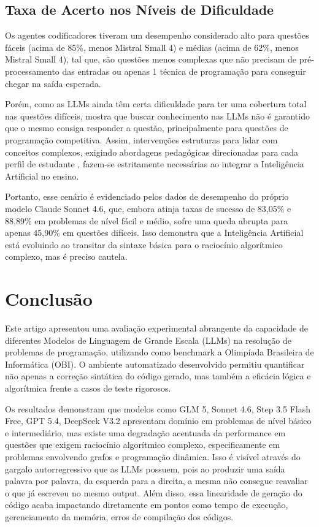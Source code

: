 \documentclass[12pt]{article}
\begin{document}
\subsection{Taxa de Acerto nos Níveis de Dificuldade}

Os agentes codificadores tiveram um desempenho considerado alto para questões fáceis (acima de 85\%, menos Mistral Small 4) e médias (acima de 62\%, menos Mistral Small 4), tal que, são questões menos complexas que não precisam de pré-processamento das entradas ou apenas 1 técnica de programação para conseguir chegar na saída esperada.

Porém, como as LLMs ainda têm certa dificuldade para ter uma cobertura total nas questões difíceis, mostra que buscar conhecimento nas LLMs não é garantido que o mesmo consiga responder a questão, principalmente para questões de programação competitiva. Assim, intervenções estruturas para lidar com conceitos complexos, exigindo abordagens pedagógicas direcionadas para cada perfil de estudante \cite{baist2017analysis}, fazem-se estritamente necessárias ao integrar a Inteligência Artificial no ensino.

Portanto, esse cenário é evidenciado pelos dados de desempenho do próprio modelo Claude Sonnet 4.6, que, embora atinja taxas de sucesso de 83,05\% e 88,89\% em problemas de nível fácil e médio, sofre uma queda abrupta para apenas 45,90\% em questões difíceis. Isso demonstra que a Inteligência Artificial está evoluindo ao transitar da sintaxe básica para o raciocínio algorítmico complexo, mas é preciso cautela.

\section{Conclusão}

Este artigo apresentou uma avaliação experimental abrangente da capacidade de diferentes Modelos de Linguagem de Grande Escala (LLMs) na resolução de problemas de programação, utilizando como benchmark a Olimpíada Brasileira de Informática (OBI). O ambiente automatizado desenvolvido permitiu quantificar não apenas a correção sintática do código gerado, mas também a eficácia lógica e algorítmica frente a casos de teste rigorosos.

Os resultados demonstram que modelos como GLM 5, Sonnet 4.6, Step 3.5 Flash Free, GPT 5.4, DeepSeek V3.2 apresentam domínio em problemas de nível básico e intermediário, mas existe uma degradação acentuada da performance em questões que exigem raciocínio algorítmico complexo, especificamente em problemas envolvendo grafos e programação dinâmica. Isso é visível através do gargalo autorregressivo que as LLMs possuem, pois ao produzir uma saída palavra por palavra, da esquerda para a direita, a mesma não consegue reavaliar o que já escreveu no mesmo output. Além disso, essa linearidade de geração do código acaba impactando diretamente em pontos como tempo de execução, gerenciamento da memória, erros de compilação dos códigos.
\end{document}
